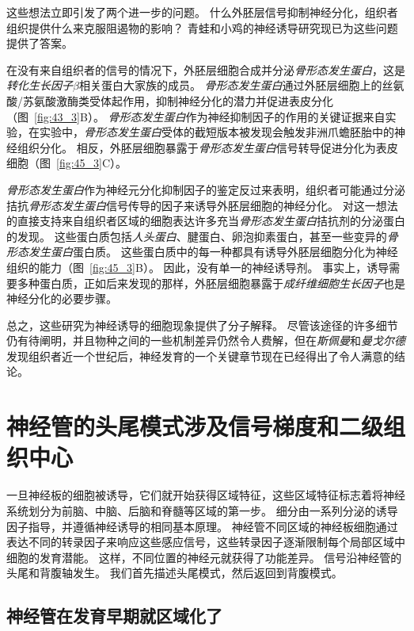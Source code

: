 这些想法立即引发了两个进一步的问题。
什么外胚层信号抑制神经分化，组织者组织提供什么来克服阻遏物的影响？
青蛙和小鸡的神经诱导研究现已为这些问题提供了答案。


在没有来自组织者的信号的情况下，外胚层细胞合成并分泌\textit{骨形态发生蛋白}，这是\textit{转化生长因子$\beta$}相关蛋白大家族的成员。
\textit{骨形态发生蛋白}通过外胚层细胞上的丝氨酸/苏氨酸激酶类受体起作用，抑制神经分化的潜力并促进表皮分化（图~\ref{fig:43_3}B）。
\textit{骨形态发生蛋白}作为神经抑制因子的作用的关键证据来自实验，在实验中，\textit{骨形态发生蛋白}受体的截短版本被发现会触发非洲爪蟾胚胎中的神经组织分化。
相反，外胚层细胞暴露于\textit{骨形态发生蛋白}信号转导促进分化为表皮细胞（图~\ref{fig:45_3}C）。


\textit{骨形态发生蛋白}作为神经元分化抑制因子的鉴定反过来表明，组织者可能通过分泌拮抗\textit{骨形态发生蛋白}信号传导的因子来诱导外胚层细胞的神经分化。
对这一想法的直接支持来自组织者区域的细胞表达许多充当\textit{骨形态发生蛋白}拮抗剂的分泌蛋白的发现。
这些蛋白质包括\textit{人头蛋白}、腱蛋白、卵泡抑素蛋白，甚至一些变异的\textit{骨形态发生蛋白}蛋白质。
这些蛋白质中的每一种都具有诱导外胚层细胞分化为神经组织的能力（图~\ref{fig:45_3}B）。
因此，没有单一的神经诱导剂。
事实上，诱导需要多种蛋白质，正如后来发现的那样，外胚层细胞暴露于\textit{成纤维细胞生长因子}也是神经分化的必要步骤。


总之，这些研究为神经诱导的细胞现象提供了分子解释。
尽管该途径的许多细节仍有待阐明，并且物种之间的一些机制差异仍然令人费解，但在\textit{斯佩曼}和\textit{曼戈尔德}发现组织者近一个世纪后，神经发育的一个关键章节现在已经得出了令人满意的结论。



\section{神经管的头尾模式涉及信号梯度和二级组织中心}

一旦神经板的细胞被诱导，它们就开始获得区域特征，这些区域特征标志着将神经系统划分为前脑、中脑、后脑和脊髓等区域的第一步。
细分由一系列分泌的诱导因子指导，并遵循神经诱导的相同基本原理。
神经管不同区域的神经板细胞通过表达不同的转录因子来响应这些感应信号，这些转录因子逐渐限制每个局部区域中细胞的发育潜能。
这样，不同位置的神经元就获得了功能差异。
信号沿神经管的头尾和背腹轴发生。
我们首先描述头尾模式，然后返回到背腹模式。



\subsection{神经管在发育早期就区域化了}

